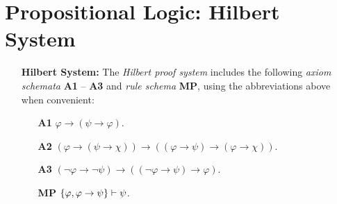 \documentclass[a4paper, 11pt]{article} %
\begin{document}
\section*{\sc Propositional Logic: Hilbert System}

\begin{enumerate}[leftmargin=1.2in]
	\item[\bf Hilbert System:] The \textit{Hilbert proof system} includes the following \textit{axiom schemata} \textbf{A1} -- \textbf{A3} and \textit{rule schema} \textbf{MP}, using the abbreviations above when convenient:
	      \begin{itemize}[leftmargin=.5in]
		      \item[\bf A1] $\varphi \rightarrow (\psi \rightarrow \varphi)$.
		      \item[\bf A2] $(\varphi \rightarrow (\psi \rightarrow \chi)) \rightarrow ((\varphi \rightarrow \psi) \rightarrow (\varphi \rightarrow \chi))$.
		      \item[\bf A3] $(\neg\varphi \rightarrow \neg\psi) \rightarrow ((\neg\varphi \rightarrow \psi) \rightarrow \varphi)$.
		      \item[\bf MP] $\lbrace\varphi, \varphi \rightarrow \psi\rbrace \vdash \psi$.

\end{itemize}
\end{enumerate}
\end{document}
